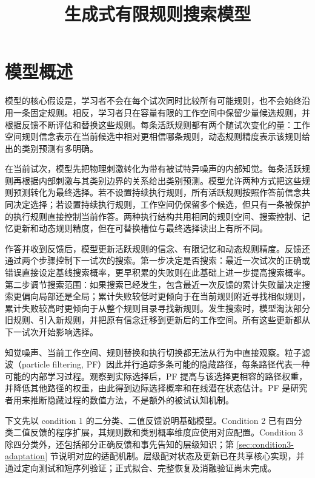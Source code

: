 \documentclass[12pt]{article}
\title{生成式有限规则搜索模型}
\author{}
\date{}
\begin{document}
\maketitle

\section{模型概述}

模型的核心假设是，学习者不会在每个试次同时比较所有可能规则，也不会始终沿用一条固定规则。相反，学习者只在容量有限的工作空间中保留少量候选规则，并根据反馈不断评估和替换这些规则。每条活跃规则都有两个随试次变化的量：工作空间规则信念表示在当前候选中相对更相信哪条规则，动态规则精度表示该规则给出的类别预测有多明确。

在当前试次，模型先把物理刺激转化为带有被试特异噪声的内部知觉。每条活跃规则再根据内部刺激与其类别边界的关系给出类别预测。模型允许两种方式把这些规则预测转化为最终选择。若不设置持续执行规则，所有活跃规则按照作答前信念共同决定选择；若设置持续执行规则，工作空间仍保留多个候选，但只有一条被保护的执行规则直接控制当前作答。两种执行结构共用相同的规则空间、搜索控制、记忆更新和动态规则精度，但在可替换槽位与最终选择读出上有所不同。

作答并收到反馈后，模型更新活跃规则的信念、有限记忆和动态规则精度。反馈还通过两个步骤控制下一试次的搜索。第一步决定是否搜索：最近一次试次的正确或错误直接设定基线搜索概率，更早积累的失败则在此基础上进一步提高搜索概率。第二步调节搜索范围：如果搜索已经发生，包含最近一次反馈的累计失败量决定搜索更偏向局部还是全局；累计失败较低时更倾向于在当前规则附近寻找相似规则，累计失败较高时更倾向于从整个规则目录寻找新规则。发生搜索时，模型淘汰部分旧规则、引入新规则，并把原有信念迁移到更新后的工作空间。所有这些更新都从下一试次开始影响选择。

知觉噪声、当前工作空间、规则替换和执行切换都无法从行为中直接观察。粒子滤波（particle filtering, PF）因此并行追踪多条可能的隐藏路径，每条路径代表一种可能的内部学习过程。观察到实际选择后，PF 提高与该选择更相容的路径权重，并降低其他路径的权重，由此得到边际选择概率和在线潜在状态估计。PF 是研究者用来推断隐藏过程的数值方法，不是额外的被试认知机制。

下文先以 condition 1 的二分类、二值反馈说明基础模型。Condition 2 已有四分类二值反馈的程序扩展，其规则数和类别概率维度应使用对应配置。Condition 3 除四分类外，还包括部分正确反馈和事先告知的层级知识；第 \ref{sec:condition3-adaptation} 节说明对应的适配机制。层级配对状态及更新已在共享核心实现，并通过定向测试和短序列验证；正式拟合、完整恢复及消融验证尚未完成。
\end{document}

